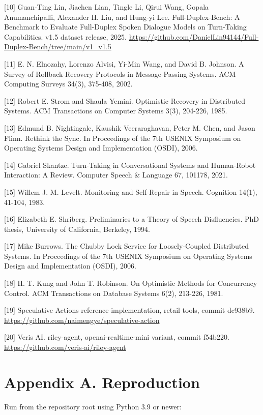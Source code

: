 \documentclass[review,12pt]{elsarticle}
\begin{document}
[10] Guan-Ting Lin, Jiachen Lian, Tingle Li, Qirui Wang, Gopala Anumanchipalli, Alexander H. Liu, and Hung-yi Lee. Full-Duplex-Bench: A Benchmark to Evaluate Full-Duplex Spoken Dialogue Models on Turn-Taking Capabilities. v1.5 dataset release, 2025. \url{https://github.com/DanielLin94144/Full-Duplex-Bench/tree/main/v1_v1.5}


[11] E. N. Elnozahy, Lorenzo Alvisi, Yi-Min Wang, and David B. Johnson. A Survey of Rollback-Recovery Protocols in Message-Passing Systems. ACM Computing Surveys 34(3), 375-408, 2002.


[12] Robert E. Strom and Shaula Yemini. Optimistic Recovery in Distributed Systems. ACM Transactions on Computer Systems 3(3), 204-226, 1985.


[13] Edmund B. Nightingale, Kaushik Veeraraghavan, Peter M. Chen, and Jason Flinn. Rethink the Sync. In Proceedings of the 7th USENIX Symposium on Operating Systems Design and Implementation (OSDI), 2006.


[14] Gabriel Skantze. Turn-Taking in Conversational Systems and Human-Robot Interaction: A Review. Computer Speech \& Language 67, 101178, 2021.


[15] Willem J. M. Levelt. Monitoring and Self-Repair in Speech. Cognition 14(1), 41-104, 1983.


[16] Elizabeth E. Shriberg. Preliminaries to a Theory of Speech Disfluencies. PhD thesis, University of California, Berkeley, 1994.


[17] Mike Burrows. The Chubby Lock Service for Loosely-Coupled Distributed Systems. In Proceedings of the 7th USENIX Symposium on Operating Systems Design and Implementation (OSDI), 2006.


[18] H. T. Kung and John T. Robinson. On Optimistic Methods for Concurrency Control. ACM Transactions on Database Systems 6(2), 213-226, 1981.


[19] Speculative Actions reference implementation, retail tools, commit dc938b9. \url{https://github.com/naimengye/speculative-action}


[20] Veris AI. riley-agent, openai-realtime-mini variant, commit f54b220. \url{https://github.com/veris-ai/riley-agent}


\section*{Appendix A. Reproduction}

Run from the repository root using Python 3.9 or newer:
\end{document}
